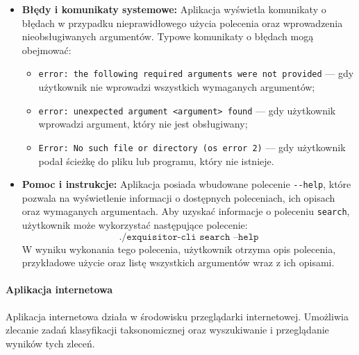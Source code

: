\begin{itemize}
{                    }
                    \item {
                        \textbf{Błędy i komunikaty systemowe:}
                        Aplikacja wyświetla komunikaty o błędach w przypadku nieprawidłowego użycia polecenia oraz wprowadzenia nieobsługiwanych argumentów. Typowe komunikaty o błędach mogą obejmować:
                        \begin{itemize}
                            \item {
                                \texttt{error: the following required arguments were not provided} — gdy użytkownik nie wprowadzi wszystkich wymaganych argumentów;
                            }
                            \item {
                                \texttt{error: unexpected argument <argument> found} — gdy użytkownik wprowadzi argument, który nie jest obsługiwany;
                            }
                            \item {
                                \texttt{Error: No such file or directory (os error 2)} — gdy użytkownik podał ścieżkę do pliku lub programu, który nie istnieje.
                            }
                        \end{itemize}
                    }
                    \item {
                        \textbf{Pomoc i instrukcje:}
                        Aplikacja posiada wbudowane polecenie \texttt{-\phantom{}-help}, które pozwala na wyświetlenie informacji o dostępnych poleceniach, ich opisach oraz wymaganych argumentach.
                        Aby uzyskać informacje o poleceniu \texttt{search}, użytkownik może wykorzystać następujące polecenie: 
                        \[
                            \texttt{./exquisitor-cli search --help}
                        \]
                        W wyniku wykonania tego polecenia, użytkownik otrzyma opis polecenia, przykładowe użycie oraz listę wszystkich argumentów wraz z ich opisami.
                    }

                \end{itemize}

            \paragraph{Aplikacja internetowa}
                Aplikacja internetowa działa w środowisku przeglądarki internetowej. Umożliwia zlecanie zadań klasyfikacji taksonomicznej oraz wyszukiwanie i przeglądanie wyników tych zleceń.

